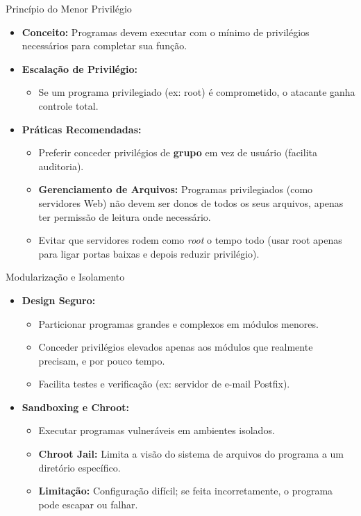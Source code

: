 \begin{frame}{Princípio do Menor Privilégio}
    \begin{itemize}
        \item \textbf{Conceito:} Programas devem executar com o mínimo de privilégios necessários para completar sua função.

        \item \textbf{Escalação de Privilégio:}
              \begin{itemize}
                  \item Se um programa privilegiado (ex: root) é comprometido, o atacante ganha controle total.
              \end{itemize}

        \item \textbf{Práticas Recomendadas:}
              \begin{itemize}
                  \item Preferir conceder privilégios de \textbf{grupo} em vez de usuário (facilita auditoria).
                  \item \textbf{Gerenciamento de Arquivos:} Programas privilegiados (como servidores Web) não devem ser donos de todos os seus arquivos, apenas ter permissão de leitura onde necessário.
                  \item Evitar que servidores rodem como \textit{root} o tempo todo (usar root apenas para ligar portas baixas e depois reduzir privilégio).
              \end{itemize}
    \end{itemize}
\end{frame}

\begin{frame}{Modularização e Isolamento}
    \begin{itemize}
        \item \textbf{Design Seguro:}
              \begin{itemize}
                  \item Particionar programas grandes e complexos em módulos menores.
                  \item Conceder privilégios elevados apenas aos módulos que realmente precisam, e por pouco tempo.
                  \item Facilita testes e verificação (ex: servidor de e-mail Postfix).
              \end{itemize}

        \item \textbf{Sandboxing e Chroot:}
              \begin{itemize}
                  \item Executar programas vulneráveis em ambientes isolados.
                  \item \textbf{Chroot Jail:} Limita a visão do sistema de arquivos do programa a um diretório específico.
                  \item \textbf{Limitação:} Configuração difícil; se feita incorretamente, o programa pode escapar ou falhar.
              \end{itemize}
    \end{itemize}
\end{frame}

